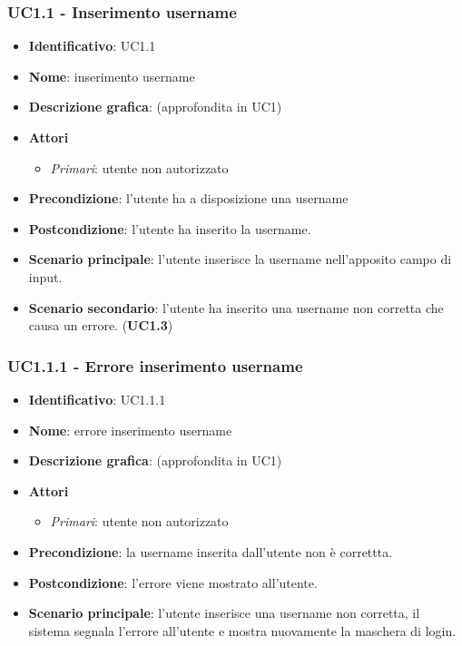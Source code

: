\subsubsection{UC1.1 - Inserimento username}
\begin{itemize}
  \item \textbf{Identificativo}: UC1.1
  \item \textbf{Nome}: inserimento username
  \item \textbf{Descrizione grafica}: (approfondita in UC1)
  \item \textbf{Attori}
        \begin{itemize}
          \item \textit{Primari}: utente non autorizzato
        \end{itemize}
  \item \textbf{Precondizione}: l'utente ha a disposizione una username
  \item \textbf{Postcondizione}: l'utente ha inserito la username.
  \item \textbf{Scenario principale}: l'utente inserisce la username nell'apposito campo di input.
  \item \textbf{Scenario secondario}: l'utente ha inserito una username non corretta che causa un errore. (\textbf{UC1.3})
\end{itemize}

\subsubsection{UC1.1.1 - Errore inserimento username}
\begin{itemize}
  \item \textbf{Identificativo}: UC1.1.1
  \item \textbf{Nome}: errore inserimento username
  \item \textbf{Descrizione grafica}: (approfondita in UC1)
  \item \textbf{Attori}
        \begin{itemize}
          \item \textit{Primari}: utente non autorizzato
        \end{itemize}
  \item \textbf{Precondizione}: la username inserita dall'utente non è correttta.
  \item \textbf{Postcondizione}: l'errore viene mostrato all'utente.
  \item \textbf{Scenario principale}: l'utente inserisce una username non corretta, il sistema segnala l'errore all'utente e mostra nuovamente la maschera di login.
\end{itemize}

